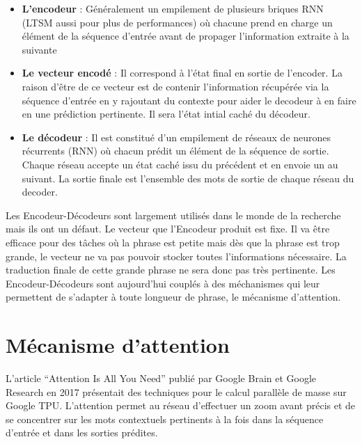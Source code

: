 \documentclass[8pt]{article}
\providecommand{\tightlist}{%
      \setlength{\itemsep}{0pt}\setlength{\parskip}{0pt}}
\begin{document}
\begin{itemize}
\tightlist
\item
  \textbf{L'encodeur} : Généralement un empilement de plusieurs briques
  RNN (LTSM aussi pour plus de performances) où chacune prend en charge
  un élément de la séquence d'entrée avant de propager l'information
  extraite à la suivante
\item
  \textbf{Le vecteur encodé} : Il correspond à l'état final en sortie de
  l'encoder. La raison d'être de ce vecteur est de contenir
  l'information récupérée via la séquence d'entrée en y rajoutant du
  contexte pour aider le decodeur à en faire en une prédiction
  pertinente. Il sera l'état intial caché du décodeur.
\item
  \textbf{Le décodeur} : Il est constitué d'un empilement de réseaux de
  neurones récurrents (RNN) où chacun prédit un élément de la séquence
  de sortie. Chaque réseau accepte un état caché issu du précédent et en
  envoie un au suivant. La sortie finale est l'ensemble des mots de
  sortie de chaque réseau du decoder.
\end{itemize}

Les Encodeur-Décodeurs sont largement utilisés dans le monde de la
recherche mais ils ont un défaut. Le vecteur que l'Encodeur produit est
fixe. Il va être efficace pour des tâches où la phrase est petite mais
dès que la phrase est trop grande, le vecteur ne va pas pouvoir stocker
toutes l'informations nécessaire. La traduction finale de cette grande
phrase ne sera donc pas très pertinente. Les Encodeur-Décodeurs sont
aujourd'hui couplés à des méchanismes qui leur permettent de s'adapter à
toute longueur de phrase, le mécanisme d'attention.

    \hypertarget{muxe9canisme-dattention}{%
\section{Mécanisme d'attention}\label{muxe9canisme-dattention}}

    L'article ``Attention Is All You Need'' publié par Google Brain et
Google Research en 2017 présentait des techniques pour le calcul
parallèle de masse sur Google TPU. L'attention permet au réseau
d'effectuer un zoom avant précis et de se concentrer sur les mots
contextuels pertinents à la fois dans la séquence d'entrée et dans les
sorties prédites.
\end{document}
